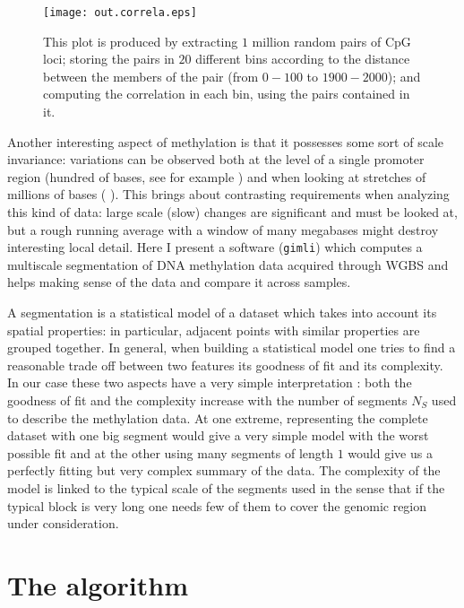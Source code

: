 \documentclass[12pt]{amsart}
\newcommand{\gimli}{\texttt{gimli}}
\begin{document}
\begin{center}
\begin{figure}\label{fig1}
\texttt{[image: out.correla.eps]}
\caption{This plot is produced by extracting $1$ million random pairs of CpG loci;
storing the pairs in $20$ different bins  according to the distance between the members
of the pair (from $0-100$ to $1900-2000$); and computing the correlation in each bin,
using the pairs contained in it.}
\end{figure}
\end{center}

Another interesting aspect of methylation is that it possesses some sort of scale 
invariance: variations can be observed both at the level of a single promoter
region (hundred of bases, see for example \cite{methylseekr}) and when looking at stretches
of millions of bases (\cite{largeblocks} ).
This brings about contrasting requirements when analyzing this kind of data: large scale (slow) changes are 
significant and must be looked at, but a rough
running average with a window of many megabases might destroy interesting
local detail. Here I present  a software (\gimli) which computes a multiscale segmentation 
of DNA methylation 
data acquired through WGBS and helps making sense of the data and compare 
it across samples.

A segmentation is a statistical model of a dataset  which takes into account its spatial properties:
in particular, adjacent points with similar properties are grouped together.
In general, when building a statistical model one tries to find a reasonable 
trade off between two 
features  its goodness of fit and its complexity.
In our case these two aspects have a very simple interpretation : both the goodness 
of fit and the complexity increase with the number of segments $N_S$ used to describe the 
methylation data.  
At one extreme, representing the complete dataset with one big segment would 
give a very simple model with the worst possible fit and 
at the other using many segments of length $1$ would give us a perfectly 
fitting but very complex summary of the data.
The complexity of the model is linked to the typical scale of the segments used
in the sense that if the typical block is very long one needs few of them to 
cover the genomic region under consideration.

\section{The algorithm}
\end{document}
